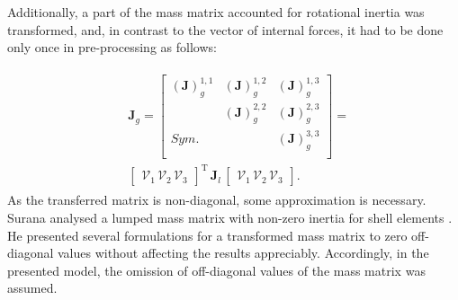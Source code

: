 \documentclass[a4paper,fleqn]{cas-dc}
\begin{document}
Additionally, a part of the mass matrix accounted for rotational inertia was transformed, and, in contrast to the vector of internal forces, it had to be done only once in pre-processing as follows:

\begin{eqnarray}
	\begin{split}
	&\textbf{J}_g=\left [ 
	\begin{array}{ccc}
		\left (\textbf{J}\right)^{1,1}_g & \left (\textbf{J}\right )^{1,2}_g & \left (\textbf{J}\right )^{1,3}_g\\
		& \left (\textbf{J}\right )^{2,2}_g & \left (\textbf{J}\right )^{2,3}_g\\
		Sym. &  & \left (\textbf{J}\right )^{3,3}_g\\
	\end{array}
	\right ] = \\
	&\left[\begin{array}{ccc}
		\mathcal{V}_1\, \mathcal{V}_2\, \mathcal{V}_3 \end{array}\right ]^{\mathrm{T}}
	\,\textbf{J}_l\,
	\left[\begin{array}{ccc}
		\mathcal{V}_1\, \mathcal{V}_2\, \mathcal{V}_3 \end{array}\right ].
	\end{split}
	\label{eq:inertia}
\end{eqnarray}
As the transferred matrix is non-diagonal, some approximation is necessary.
Surana analysed a lumped mass matrix with non-zero inertia for shell elements \cite{surana1980transition}.
He presented several formulations for a transformed mass matrix to zero off-diagonal values without affecting the results appreciably.
Accordingly, in the presented model, the omission of off-diagonal values of the mass matrix was assumed.
\end{document}
